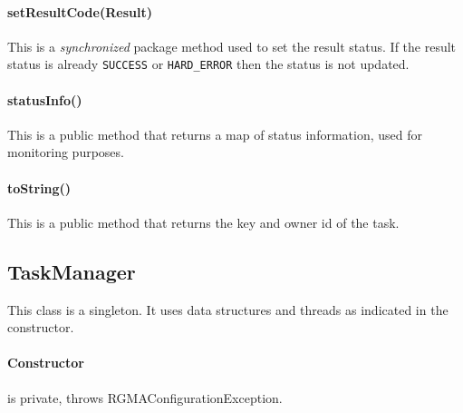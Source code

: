 \paragraph{setResultCode(Result)}This is a \emph{synchronized} package method 
used to set the result status. If the result status is already \texttt{SUCCESS} 
or \texttt{HARD\_ERROR} then the status is not updated.

\paragraph{statusInfo()}This is a public method that returns a map of status 
information, used for monitoring purposes.

\paragraph{toString()}
This is a public method that returns the key and owner id of the task.

\subsection{TaskManager}
This class is a singleton. It uses data structures and threads as indicated in 
the constructor.

\paragraph{Constructor} is private, throws RGMAConfigurationException.

